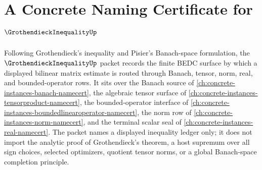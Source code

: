 \chapter{A Concrete Naming Certificate for $\GrothendieckInequalityUp$}
\label{ch:concrete-instances-grothendieck-inequality-namecert}

Following Grothendieck's inequality and Pisier's Banach-space formulation, the $\GrothendieckInequalityUp$ packet records the finite BEDC surface by which a displayed bilinear matrix estimate is routed through Banach, tensor, norm, real, and bounded-operator rows. It sits over the Banach source of \autoref{ch:concrete-instances-banach-namecert}, the algebraic tensor surface of \autoref{ch:concrete-instances-tensorproduct-namecert}, the bounded-operator interface of \autoref{ch:concrete-instances-boundedlinearoperator-namecert}, the norm row of \autoref{ch:concrete-instances-norm-namecert}, and the terminal scalar seal of \autoref{ch:concrete-instances-real-namecert}. The packet names a displayed inequality ledger only; it does not import the analytic proof of Grothendieck's theorem, a host supremum over all sign choices, selected optimizers, quotient tensor norms, or a global Banach-space completion principle.

